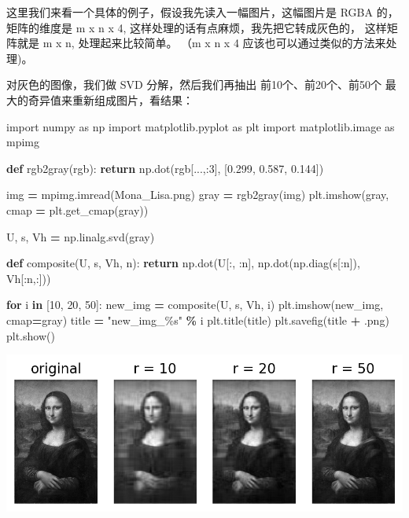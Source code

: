 \documentclass[
]{book}
\newenvironment{Shaded}{\begin{snugshade}}{\end{snugshade}}
\newcommand{\ControlFlowTok}[1]{\textcolor[rgb]{0.13,0.29,0.53}{\textbf{#1}}}
\newcommand{\DecValTok}[1]{\textcolor[rgb]{0.00,0.00,0.81}{#1}}
\newcommand{\FloatTok}[1]{\textcolor[rgb]{0.00,0.00,0.81}{#1}}
\newcommand{\ImportTok}[1]{#1}
\newcommand{\KeywordTok}[1]{\textcolor[rgb]{0.13,0.29,0.53}{\textbf{#1}}}
\newcommand{\NormalTok}[1]{#1}
\newcommand{\OperatorTok}[1]{\textcolor[rgb]{0.81,0.36,0.00}{\textbf{#1}}}
\newcommand{\SpecialCharTok}[1]{\textcolor[rgb]{0.00,0.00,0.00}{#1}}
\newcommand{\StringTok}[1]{\textcolor[rgb]{0.31,0.60,0.02}{#1}}
\begin{document}
这里我们来看一个具体的例子，假设我先读入一幅图片，这幅图片是 RGBA 的，矩阵的维度是 m x n x 4, 这样处理的话有点麻烦，我先把它转成灰色的， 这样矩阵就是 m x n, 处理起来比较简单。 （m x n x 4 应该也可以通过类似的方法来处理)。

对灰色的图像，我们做 SVD 分解，然后我们再抽出 前10个、前20个、前50个 最大的奇异值来重新组成图片，看结果：

\begin{Shaded}
\begin{Highlighting}[]
\ImportTok{import}\NormalTok{ numpy }\ImportTok{as}\NormalTok{ np}
\ImportTok{import}\NormalTok{ matplotlib.pyplot }\ImportTok{as}\NormalTok{ plt}
\ImportTok{import}\NormalTok{ matplotlib.image }\ImportTok{as}\NormalTok{ mpimg}

\KeywordTok{def}\NormalTok{ rgb2gray(rgb):}
    \ControlFlowTok{return}\NormalTok{ np.dot(rgb[...,:}\DecValTok{3}\NormalTok{], [}\FloatTok{0.299}\NormalTok{, }\FloatTok{0.587}\NormalTok{, }\FloatTok{0.144}\NormalTok{])}

\NormalTok{img }\OperatorTok{=}\NormalTok{ mpimg.imread(}\StringTok{\textquotesingle{}Mona\_Lisa.png\textquotesingle{}}\NormalTok{)}
\NormalTok{gray }\OperatorTok{=}\NormalTok{ rgb2gray(img)}
\NormalTok{plt.imshow(gray, cmap }\OperatorTok{=}\NormalTok{ plt.get\_cmap(}\StringTok{\textquotesingle{}gray\textquotesingle{}}\NormalTok{))}

\NormalTok{U, s, Vh }\OperatorTok{=}\NormalTok{ np.linalg.svd(gray)}

\KeywordTok{def}\NormalTok{ composite(U, s, Vh, n):}
    \ControlFlowTok{return}\NormalTok{ np.dot(U[:, :n], np.dot(np.diag(s[:n]), Vh[:n,:]))}

\ControlFlowTok{for}\NormalTok{ i }\KeywordTok{in}\NormalTok{ [}\DecValTok{10}\NormalTok{, }\DecValTok{20}\NormalTok{, }\DecValTok{50}\NormalTok{]:}
\NormalTok{    new\_img }\OperatorTok{=}\NormalTok{ composite(U, s, Vh, i)}
\NormalTok{    plt.imshow(new\_img, cmap}\OperatorTok{=}\StringTok{\textquotesingle{}gray\textquotesingle{}}\NormalTok{)}
\NormalTok{    title }\OperatorTok{=} \StringTok{"new\_img\_}\SpecialCharTok{\%s}\StringTok{"} \OperatorTok{\%}\NormalTok{ i}
\NormalTok{    plt.title(title)}
\NormalTok{    plt.savefig(title }\OperatorTok{+} \StringTok{\textquotesingle{}.png\textquotesingle{}}\NormalTok{)}
\NormalTok{    plt.show()}
\end{Highlighting}
\end{Shaded}

\includegraphics{images/final.png}
\end{document}
